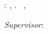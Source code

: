 \thispagestyle{empty}

\hfill

\vfill

\noindent\myName: \emph{\myTitle,} \mySubtitle.
\textcopyright~\myLocation,~\myDate

\medskip
%
\noindent\textit{Supervisor}:~\myProf \\
